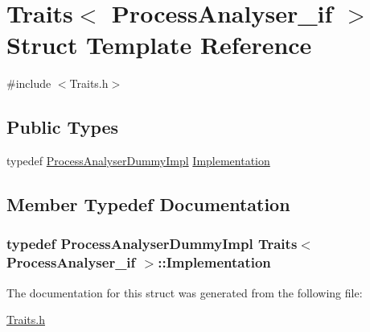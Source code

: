 \hypertarget{struct_traits_3_01_process_analyser__if_01_4}{}\section{Traits$<$ Process\+Analyser\+\_\+if $>$ Struct Template Reference}
\label{struct_traits_3_01_process_analyser__if_01_4}


{\ttfamily \#include $<$Traits.\+h$>$}

\subsection*{Public Types}
\begin{DoxyCompactItemize}
\item 
typedef \hyperlink{class_process_analyser_dummy_impl}{Process\+Analyser\+Dummy\+Impl} \hyperlink{struct_traits_3_01_process_analyser__if_01_4_a781d9c2404abb47faea574df0e168c3a}{Implementation}
\end{DoxyCompactItemize}


\subsection{Member Typedef Documentation}
\subsubsection[{\texorpdfstring{Implementation}{Implementation}}]{\setlength{\rightskip}{0pt plus 5cm}typedef {\bf Process\+Analyser\+Dummy\+Impl} {\bf Traits}$<$ {\bf Process\+Analyser\+\_\+if} $>$\+::{\bf Implementation}}\hypertarget{struct_traits_3_01_process_analyser__if_01_4_a781d9c2404abb47faea574df0e168c3a}{}\label{struct_traits_3_01_process_analyser__if_01_4_a781d9c2404abb47faea574df0e168c3a}


The documentation for this struct was generated from the following file\+:\begin{DoxyCompactItemize}
\item 
\hyperlink{_traits_8h}{Traits.\+h}\end{DoxyCompactItemize}
